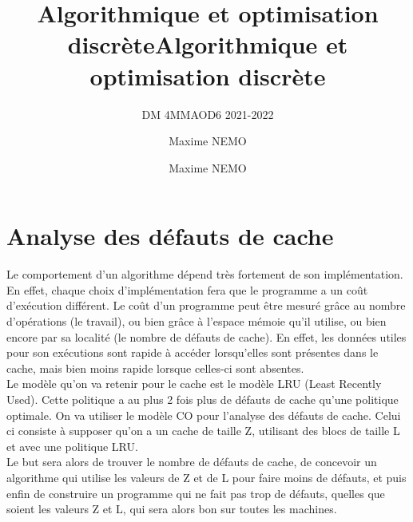 \documentclass[
  paper=a4,
  ,captions=tableheading
]{scrartcl}
\title{Algorithmique et optimisation discrète}
\subtitle{DM 4MMAOD6 2021-2022}
\author{Maxime NEMO}
\date{}
\title{Algorithmique et optimisation discrète}
\author{Maxime NEMO}
\date{}
\begin{document}
\begin{titlepage}
\newcommand{\colorRule}[3][black]{\textcolor[HTML]{#1}{\rule{#2}{#3}}}
\end{titlepage}
\restoregeometry




{
\setcounter{tocdepth}{2}
\tableofcontents
\newpage
}
\hypertarget{analyse-des-duxe9fauts-de-cache}{%
\section{Analyse des défauts de
cache}\label{analyse-des-duxe9fauts-de-cache}}

Le comportement d'un algorithme dépend très fortement de son
implémentation. En effet, chaque choix d'implémentation fera que le
programme a un coût d'exécution différent. Le coût d'un programme peut
être mesuré grâce au nombre d'opérations (le travail), ou bien grâce à
l'espace mémoie qu'il utilise, ou bien encore par sa localité (le nombre
de défauts de cache). En effet, les données utiles pour son exécutions
sont rapide à accéder lorsqu'elles sont présentes dans le cache, mais
bien moins rapide lorsque celles-ci sont absentes.\\
Le modèle qu'on va retenir pour le cache est le modèle LRU (Least
Recently Used). Cette politique a au plus 2 fois plus de défauts de
cache qu'une politique optimale. On va utiliser le modèle CO pour
l'analyse des défauts de cache. Celui ci consiste à supposer qu'on a un
cache de taille Z, utilisant des blocs de taille L et avec une politique
LRU.\\
Le but sera alors de trouver le nombre de défauts de cache, de concevoir
un algorithme qui utilise les valeurs de Z et de L pour faire moins de
défauts, et puis enfin de construire un programme qui ne fait pas trop
de défauts, quelles que soient les valeurs Z et L, qui sera alors bon
sur toutes les machines.\\
\hspace*{0.333em}
\end{document}
